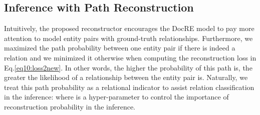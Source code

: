 \documentclass[letterpaper]{article} \usepackage{aaai21}  \usepackage{times}  \usepackage{helvet} \usepackage{courier}  \usepackage[hyphens]{url}  \usepackage{graphicx} \urlstyle{rm} \def\UrlFont{\rm}  \usepackage{natbib}  \usepackage{caption} \frenchspacing  \setlength{\pdfpagewidth}{8.5in}  \setlength{\pdfpageheight}{11in}  \usepackage{amsmath}
\begin{document}
\subsection{Inference with Path Reconstruction}
Intuitively, the proposed reconstructor encourages the DocRE model to pay more attention to model entity pairs with ground-truth relationships.
Furthermore, we maximized the path probability between one entity pair if there is indeed a relation and we minimized it otherwise when computing the reconstruction loss in Eq.\eqref{eq10:loss2new}.
In other words, the higher the probability of this path is, the greater the likelihood of a relationship between the entity pair is.
Naturally, we treat this path probability as a relational indicator to assist relation classification in the inference:
where  is a hyper-parameter to control the importance of reconstruction probability in the inference. 
\end{document}
